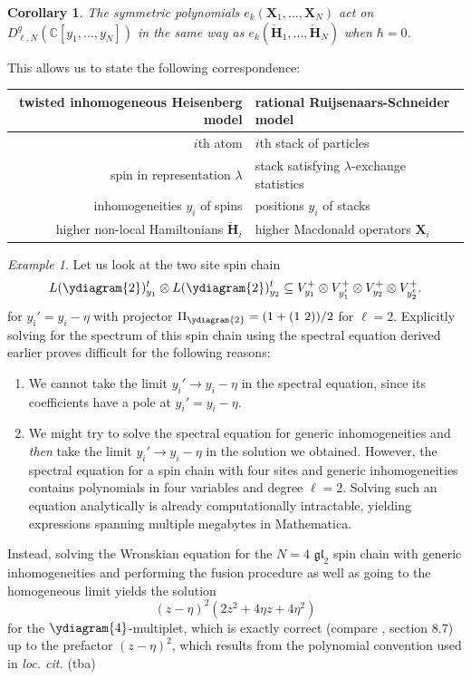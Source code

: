 \documentclass[11pt]{report}
\newtheorem{corollary}[theorem]{Corollary}
\theoremstyle{definition}
\theoremstyle{remark}
\theoremstyle{remark}
\newtheorem*{example}{Example}
\newcommand{\C}{\mathbb{C}}
\begin{document}
\begin{corollary}
The symmetric polynomials $e_k(\mathbf{X}_1,...,\mathbf{X}_N)$ act on $D_{\ell,N}^g(\C[y_1,...,y_N])$ in the same way as $e_k(\mathbf{\check H}_1,...,\mathbf{\check H}_N)$ when $\hbar = 0$.
\end{corollary}

This allows us to state the following correspondence:

\begin{center}
\begin{tabular}{|r||l|}
\hline
twisted inhomogeneous Heisenberg model & rational Ruijsenaars-Schneider model \\
\hline
$i$th atom & $i$th stack of particles \\
spin in representation $\lambda$ & stack satisfying $\lambda$-exchange statistics \\
inhomogeneities $y_i$ of spins & positions $y_i$ of stacks \\
higher non-local Hamiltonians $\mathbf{\check H}_i$ & higher Macdonald operators $\mathbf{X}_i$ \\
\hline
\end{tabular}
\end{center}

\begin{example}
Let us look at the two site spin chain
\begin{equation*}
L(\ydiagram{2})_{y_1}^t \otimes L(\ydiagram{2})_{y_2}^t \subseteq V_{y_1}^+ \otimes V_{y_1'}^+ \otimes V_{y_2}^+ \otimes V_{y_2'}^+.
\end{equation*}
for $y_i' = y_i-\eta$ with projector $\Pi_{\ydiagram{2}} = (1 + (1 \ 2))/2$ for $\ell=2$. Explicitly solving for the spectrum of this spin chain using the spectral equation derived earlier proves difficult for the following reasons:
\begin{enumerate}[label=(\roman*)]
\item We cannot take the limit $y_i' \to y_i - \eta$ in the spectral equation, since its coefficients have a pole at $y_i'=y_i-\eta$.
\item We might try to solve the spectral equation for generic inhomogeneities and \emph{then} take the limit $y_i' \to y_i - \eta$ in the solution we obtained. However, the spectral equation for a spin chain with four sites and generic inhomogeneities contains polynomials in four variables and degree $\ell = 2$. Solving such an equation analytically is already computationally intractable, yielding expressions spanning multiple megabytes in Mathematica.
\end{enumerate}
Instead, solving the Wronskian equation \cite{book:arutyunov:betheAnsatz} for the $N=4$ $\mathfrak{gl}_2$ spin chain with generic inhomogeneities and performing the fusion procedure as well as going to the homogeneous limit yields the solution
\begin{equation*}
(z-\eta)^2 (2 z^2 + 4 \eta z + 4 \eta^2)
\end{equation*}
for the $\ydiagram{4}$-multiplet, which is exactly correct (compare \cite{book:arutyunov:betheAnsatz}, section 8.7) up to the prefactor $(z-\eta)^2$, which results from the polynomial convention used in \emph{loc. cit.} (tba)
\end{example}
\end{document}
